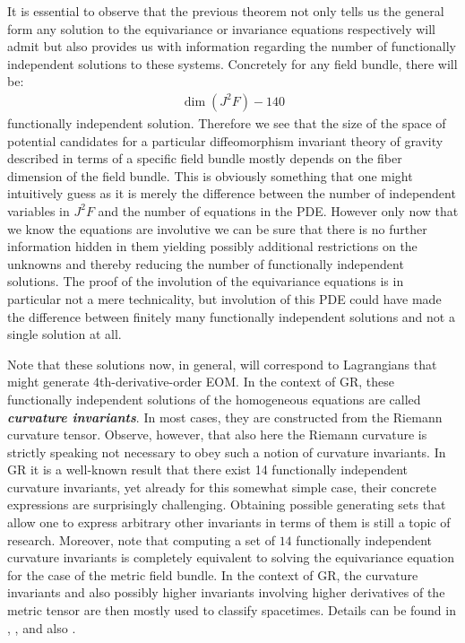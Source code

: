 It is essential to observe that the previous theorem not only tells us the general form any solution to the equivariance or invariance equations respectively will admit but also provides us with information regarding the number of functionally independent solutions to these systems. Concretely for any field bundle, there will be: 
\begin{align}
    \operatorname{dim}(J^2F) - 140 
\end{align}
functionally independent solution.
Therefore we see that the size of the space of potential candidates for a particular diffeomorphism invariant theory of gravity described in terms of a specific field bundle mostly depends on the fiber dimension of the field bundle. 
This is obviously something that one might intuitively guess as it is merely the difference between the number of independent variables in $J^2F$ and the number of equations in the PDE. However only now that we know the equations are involutive we can be sure that there is no further information hidden in them yielding possibly additional restrictions on the unknowns and thereby reducing the number of functionally independent solutions. 
The proof of the involution of the equivariance equations is in particular not a mere technicality, but involution of this PDE could have made the difference between finitely many functionally independent solutions and not a single solution at all. 

Note that these solutions now, in general, will correspond to Lagrangians that might generate $4$th-derivative-order EOM. 
In the context of GR, these functionally independent solutions of the homogeneous equations are called \textit{\textbf{curvature invariants}}. In most cases, they are constructed from the Riemann curvature tensor. Observe, however, that also here the Riemann curvature is strictly speaking not necessary to obey such a notion of curvature invariants. 
In GR it is a well-known result that there exist 14 functionally independent curvature invariants, yet already for this somewhat simple case, their concrete expressions are surprisingly challenging. Obtaining possible generating sets that allow one to express arbitrary other invariants in terms of them is still a topic of research. 
Moreover, note that computing a set of $14$ functionally independent curvature invariants is completely equivalent to solving the equivariance equation for the case of the metric field bundle.
In the context of GR, the curvature invariants and also possibly higher invariants involving higher derivatives of the metric tensor are then mostly used to classify spacetimes. Details can be found in
\cite{2009CQGra..26b5013C}, \cite{Zakhary1997}, \cite{2002IJMPD..11..827C} and also \cite{doi:10.1063/1.531425}.

